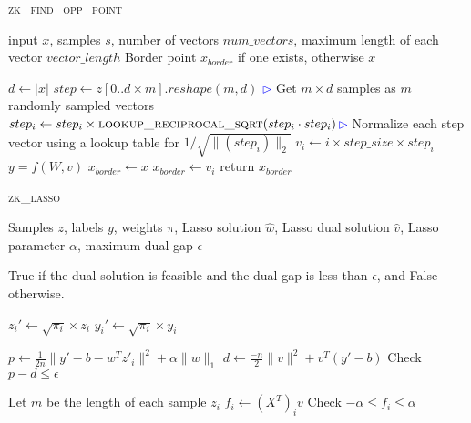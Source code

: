 \begin{algorithm}[htbp]
\begin{algorithmic}[1]
   \caption{\textsc{zk\_find\_opp\_point}}
   \label{alg:zk_find_opp_point}

     input $x$, samples $s$, number of vectors $num\_vectors$, maximum length of each vector $vector\_length$
     Border point $x_{border}$ if one exists, otherwise $x$

    \STATE $d \gets |x|$
    \STATE $step \gets z[0..d\times m].reshape(m, d)$ \hfill\textcolor{blue}{$\rhd$} Get $m \times d$ samples as $m$ randomly sampled vectors
        \STATE $step_i \gets step_i \times \textsc{lookup\_reciprocal\_sqrt}(step_i \cdot step_i)$\hfill\textcolor{blue}{$\rhd$} Normalize each step vector using a lookup table for $1 / \sqrt{\|(step_i)\|_2}$
    \ENDFOR
            \STATE $v_i \gets i \times step\_size \times step_i$
        \ENDFOR
    \ENDFOR
    \STATE $y = f(W, v)$
    \STATE $x_{border} \gets x$
                \STATE $x_{border} \gets v_i$
            \ENDIF
        \ENDFOR
    \ENDFOR
    \STATE return $x_{border}$
\end{algorithmic}
\end{algorithm}

\begin{algorithm}[htbp]
\begin{algorithmic}[1]
   \caption{\textsc{zk\_lasso}}
   \label{alg:zk_lasso}

    Samples $z$, labels $y$, weights $\pi$, Lasso solution $\hat{w}$, Lasso dual solution $\hat{v}$, Lasso parameter $\alpha$, maximum dual gap $\epsilon$

     True if the dual solution is feasible and the dual gap is less than $\epsilon$, and False otherwise.

    \STATE $z_i' \leftarrow \sqrt{\pi_i} \times z_i$
    \STATE $y_i' \leftarrow \sqrt{\pi_i} \times y_i$
    \ENDFOR

    \STATE $p \leftarrow \frac{1}{2n} \lVert y' - b - w^T z'_i \rVert^2  + \alpha \lVert w \rVert_1$
    \STATE $d \leftarrow \frac{-n}{2} \lVert v \rVert^2 + v^T (y' - b)$
    \STATE Check $p - d \leq \epsilon$

    \STATE Let $m$ be the length of each sample $z_i$
    \STATE $f_i \leftarrow (X^T)_i v$
    \STATE Check $-\alpha \leq f_i \leq \alpha$
    \ENDFOR
\end{algorithmic}
\end{algorithm}

